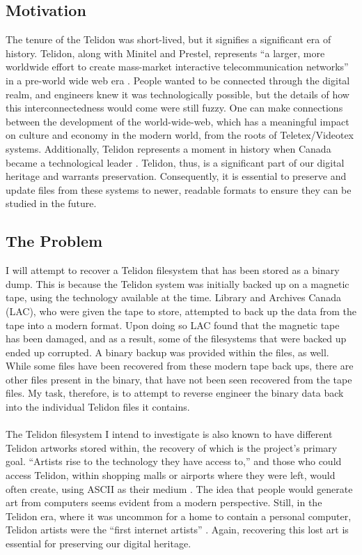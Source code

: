 \documentclass[sigconf]{acmart}
\begin{document}
\subsection{Motivation}

The tenure of the Telidon was short-lived, but it signifies a significant era of history. Telidon, along with Minitel and Prestel, represents “a larger, more worldwide effort to create mass-market interactive telecommunication networks” in a pre-world wide web era \cite{durno}. People wanted to be connected through the digital realm, and engineers knew it was technologically possible, but the details of how this interconnectedness would come were still fuzzy. One can make connections between the development of the world-wide-web, which has a meaningful impact on culture and economy in the modern world, from the roots of Teletex/Videotex systems. Additionally, Telidon represents a moment in history when Canada became a technological leader \cite{alma_1985}. Telidon, thus, is a significant part of our digital heritage and warrants preservation. Consequently, it is essential to preserve and update files from these systems to newer, readable formats to ensure they can be studied in the future.


\subsection{The Problem}
I will attempt to recover a Telidon filesystem that has been stored as a binary dump. This is because the Telidon system was initially backed up on a magnetic tape, using the technology available at the time. Library and Archives Canada (LAC), who were given the tape to store, attempted to back up the data from the tape into a modern format. Upon doing so LAC found that the magnetic tape has been damaged, and as a result, some of the filesystems that were backed up ended up corrupted. A binary backup was provided within the files, as well. While some files have been recovered from these modern tape back ups, there are other files present in the binary, that have not been seen recovered from the tape files. My task, therefore, is to attempt to reverse engineer the binary data back into the individual Telidon files it contains.  \\ \\

The Telidon filesystem I intend to investigate is also known to have different Telidon artworks stored within, the recovery of which is the project's primary goal. “Artists rise to the technology they have access to,” and those who could access Telidon, within shopping malls or airports where they were left, would often create, using ASCII as their medium \cite{hampton_2018}. The idea that people would generate art from computers seems evident from a modern perspective. Still, in the Telidon era, where it was uncommon for a home to contain a personal computer, Telidon artists were the “first internet artists” \cite{hampton_2018}. Again, recovering this lost art is essential for preserving our digital heritage.
\end{document}
